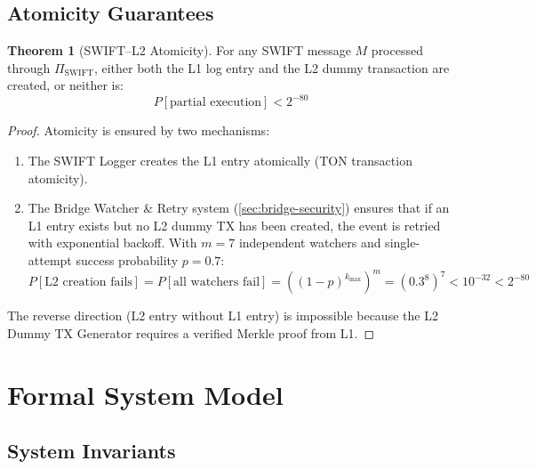 \documentclass[12pt,a4paper]{article}
\theoremstyle{definition}
\newtheorem{theorem}{Theorem}[section]
\theoremstyle{remark}
\begin{document}
\subsection{Atomicity Guarantees}

\begin{theorem}[SWIFT--L2 Atomicity]
\label{thm:swift-atomicity}
For any SWIFT message $M$ processed through $\Pi_{\text{SWIFT}}$, either both the L1 log entry and the L2 dummy transaction are created, or neither is:
\begin{equation}
P[\text{partial execution}] < 2^{-80}
\end{equation}
\end{theorem}

\begin{proof}
Atomicity is ensured by two mechanisms:
\begin{enumerate}
    \item The SWIFT Logger creates the L1 entry atomically (TON transaction atomicity).
    \item The Bridge Watcher \& Retry system (\cref{sec:bridge-security}) ensures that if an L1 entry exists but no L2 dummy TX has been created, the event is retried with exponential backoff. With $m = 7$ independent watchers and single-attempt success probability $p = 0.7$:
    \begin{equation}
    P[\text{L2 creation fails}] = P[\text{all watchers fail}] = \left((1-p)^{k_{\max}}\right)^m = (0.3^8)^7 < 10^{-32} < 2^{-80}
    \end{equation}
\end{enumerate}
The reverse direction (L2 entry without L1 entry) is impossible because the L2 Dummy TX Generator requires a verified Merkle proof from L1.
\end{proof}


\section{Formal System Model}
\label{sec:formal-model}

\subsection{System Invariants}
\end{document}

